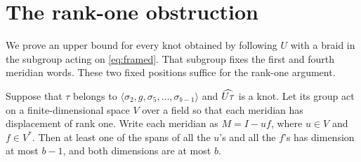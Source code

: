 \section{The rank-one obstruction}\label{sec:rank}

We prove an upper bound for every knot obtained by following \(U\)
with a braid in the subgroup acting on \eqref{eq:framed}. That
subgroup fixes the first and fourth meridian words. These two fixed
positions suffice for the rank-one argument.

\begin{lemma}\label{lem:spans}
Suppose that \(\tau\) belongs to
\(\langle\sigma_2,g,\sigma_5,\ldots,\sigma_{b-1}\rangle\) and
\(\widehat{U\tau}\) is a knot. Let its group act on a finite-dimensional
space \(V\) over a field so that each meridian has displacement
of rank one. Write each meridian as \(M=I-u f\), where \(u\in V\)
and \(f\in V^*\). Then at least one of the spans of all the \(u\)'s
and all the \(f\)'s has dimension at most \(b-1\), and both
dimensions are at most \(b\).
\end{lemma}


